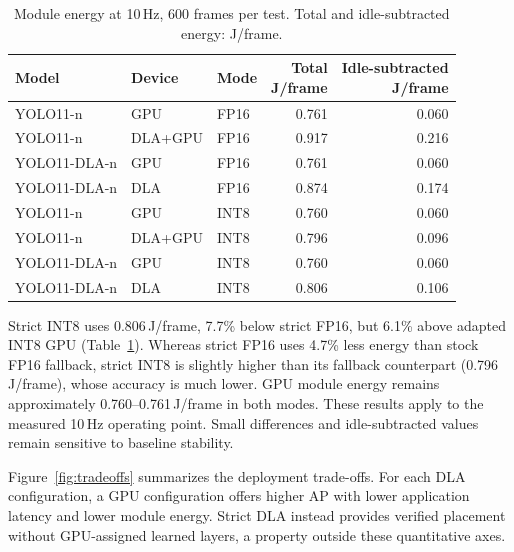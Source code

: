 \begin{table}[t]
\caption{Module energy at 10\,Hz, 600 frames per test. Total and idle-subtracted energy: J/frame.}
\label{tab:energy}\centering\footnotesize
\setlength{\tabcolsep}{3pt}
\begin{tabular*}{\columnwidth}{@{\extracolsep{\fill}}lllrr@{}}
\toprule
Model & Device & Mode & \shortstack{Total\\J/frame} & \shortstack{Idle-subtracted\\J/frame} \\
\midrule
YOLO11-n & GPU & FP16 & 0.761 & 0.060 \\
YOLO11-n & DLA+GPU & FP16 & 0.917 & 0.216 \\
YOLO11-DLA-n & GPU & FP16 & 0.761 & 0.060 \\
YOLO11-DLA-n & DLA & FP16 & 0.874 & 0.174 \\
\midrule
YOLO11-n & GPU & INT8 & 0.760 & 0.060 \\
YOLO11-n & DLA+GPU & INT8 & 0.796 & 0.096 \\
YOLO11-DLA-n & GPU & INT8 & 0.760 & 0.060 \\
YOLO11-DLA-n & DLA & INT8 & 0.806 & 0.106 \\
\bottomrule
\end{tabular*}
\end{table}
Strict INT8 uses 0.806\,J/frame, 7.7\% below strict FP16, but 6.1\% above
adapted INT8 GPU (Table~\ref{tab:energy}). Whereas strict FP16 uses 4.7\% less
energy than stock FP16 fallback, strict INT8 is slightly higher than its
fallback counterpart (0.796\,J/frame), whose accuracy is much lower.
GPU module energy remains approximately 0.760--0.761\,J/frame in both modes.
These results apply to the measured 10\,Hz operating point. Small differences
and idle-subtracted values remain sensitive to baseline stability.

Figure~\ref{fig:tradeoffs} summarizes the deployment trade-offs. For each DLA
configuration, a GPU configuration offers higher AP with lower application
latency and lower module energy. Strict DLA instead provides verified placement
without GPU-assigned learned layers, a property outside these quantitative axes.

